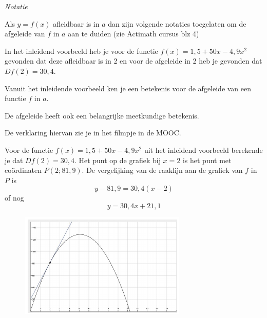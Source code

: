 \emph{Notatie}

Als $y=f(x)$ afleidbaar is in $a$ dan zijn volgende notaties toegelaten om de afgeleide van $f$ in $a$ aan te duiden (zie Actimath cursus blz 4)


\begin{voorbeeld}
	In het inleidend voorbeeld heb je voor de functie  $f(x)=1,5+50 x -4,9 x^2$ gevonden dat deze afleidbaar is in 2 en voor de afgeleide in 2 heb je gevonden dat $Df(2)=30,4$.
\end{voorbeeld}\vspace{0,5 cm}

\noindent Vanuit het inleidende voorbeeld ken je een betekenis voor de afgeleide van een functie $f$ in $a$.\vspace{0,2 cm}

\vspace{0,5 cm}

\noindent De afgeleide heeft ook een belangrijke meetkundige betekenis.\vspace{0,2 cm}

\vspace{0,2 cm}

De verklaring hiervan zie je in het filmpje in de MOOC.

\begin{voorbeeld}
	Voor de functie $f(x)=1,5+50 x -4,9 x^2$ uit het inleidend voorbeeld berekende je dat $Df(2)=30,4$.
	Het punt op de grafiek bij $x=2$ is het punt met co\"ordinaten $P(2;81,9)$.
	De vergelijking van de raaklijn aan de grafiek van $f$ in $P$ is
	\[
	y-81,9=30,4(x-2)
	\]
	of nog
	\[
	y=30,4x+21,1
	\]
	
	\begin{figure}[h]
		\begin{center}
			\includegraphics[height=5 cm]{6_afgeleiden_integralen/inputs/grafTang.JPG}
		\end{center}
	\end{figure}
\end{voorbeeld}\vspace{0,5 cm}

